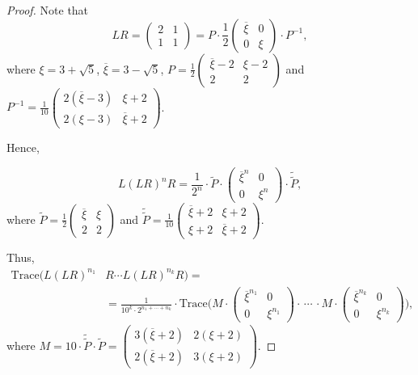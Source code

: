 \documentclass[12pt,reqno]{amsart}
\numberwithin{equation}{part}
\theoremstyle{plain}
\theoremstyle{definition}
\newcommand{\Tr}{\mathrm{Trace}}
\begin{document}
\begin{proof}
Note that
\[
LR=\begin{pmatrix}
2 & 1 \\
1 & 1 
\end{pmatrix}=P\cdot \frac{1}{2}\begin{pmatrix}
\overline{\xi} & 0 \\
0 & \xi 
\end{pmatrix}\cdot P^{-1},
\]
where $\xi=3+\sqrt{5}$, $\overline{\xi}=3-\sqrt{5}$, $P=\frac{1}{2}\begin{pmatrix}
    \overline{\xi}-2 & \xi -2 \\ 2 & 2
\end{pmatrix}$ and $P^{-1}=\frac{1}{10}\begin{pmatrix}
    2(\overline{\xi}-3) & \xi+2 \\ 2(\xi-3) & \overline{\xi}+2
\end{pmatrix}$.

Hence, 

\[
L(LR)^nR=\frac{1}{2^n}\cdot \tilde{P}\cdot  \begin{pmatrix}
\overline{\xi}^n & 0 \\
0 & \xi^n 
\end{pmatrix} \cdot \tilde{\tilde{P}},
\]
where $\tilde{P}=\frac{1}{2}\begin{pmatrix}
    \overline{\xi} & \xi \\ 2 & 2
\end{pmatrix}$ and $\tilde{\tilde{P}}=\frac{1}{10}\begin{pmatrix}
    \overline{\xi}+2 & \xi+2 \\ \xi+2 & \overline{\xi}+2
\end{pmatrix}$.

Thus,
\begin{align*}
\Tr(L(LR)^{n_1}&R\cdots L(LR)^{n_k}R)=\\ &=\frac{1}{10^{k}\cdot 2^{n_1+\cdots + n_k}}\cdot \Tr\Bigg(M\cdot \begin{pmatrix}
    \overline{\xi}^{n_1} & 0 \\ 0 & \xi^{n_1} 
\end{pmatrix}\cdot \, \cdots\, \cdot M\cdot \begin{pmatrix}
    \overline{\xi}^{n_k} & 0 \\ 0 & \xi^{n_k} 
\end{pmatrix} \Bigg),
\end{align*}
where $M=10\cdot \tilde{\tilde{P}}\cdot \tilde{P}=\begin{pmatrix}
    3(\overline{\xi}+2) & 2(\xi+2)\\ 2(\overline{\xi}+2) & 3(\xi+2)
\end{pmatrix}.$ 


\end{proof}
\end{document}
